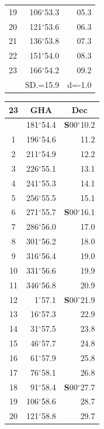 \documentclass[10pt, a4paper]{report}
\begin{document}
\begin{scriptsize}
\begin{tabular*}{0.2\textwidth}[t]{@{\extracolsep{\fill}}|c|rr|}
19 & 106$^\circ$53.3 & 05.3\\
20 & 121$^\circ$53.6 & 06.3\\
21 & 136$^\circ$53.8 & \raisebox{0.24ex}{\boldmath$\cdot$~\boldmath$\cdot$~~}07.3\\
22 & 151$^\circ$54.0 & 08.3\\
23 & 166$^\circ$54.2 & 09.2\\
\hline
\rule{0pt}{2.4ex} & \multicolumn{1}{c}{SD.=15.9} & \multicolumn{1}{c|}{d=-1.0}\\
\hline
\end{tabular*}\noindent
\begin{tabular*}{0.2\textwidth}[t]{@{\extracolsep{\fill}}|c|rr|}
\hline
\multicolumn{1}{|c|}{\rule{0pt}{2.6ex}\textbf{23}} & \multicolumn{1}{c}{\textbf{GHA}} & \multicolumn{1}{c|}{\textbf{Dec}}\\
\hline\rule{0pt}{2.6ex}\noindent
0 & 181$^\circ$54.4 & \textbf{S}00$^\circ$10.2\\
1 & 196$^\circ$54.6 & 11.2\\
2 & 211$^\circ$54.9 & 12.2\\
3 & 226$^\circ$55.1 & \raisebox{0.24ex}{\boldmath$\cdot$~\boldmath$\cdot$~~}13.1\\
4 & 241$^\circ$55.3 & 14.1\\
5 & 256$^\circ$55.5 & 15.1\\[2Pt]
6 & 271$^\circ$55.7 & \textbf{S}00$^\circ$16.1\\
7 & 286$^\circ$56.0 & 17.0\\
8 & 301$^\circ$56.2 & 18.0\\
9 & 316$^\circ$56.4 & \raisebox{0.24ex}{\boldmath$\cdot$~\boldmath$\cdot$~~}19.0\\
10 & 331$^\circ$56.6 & 19.9\\
11 & 346$^\circ$56.8 & 20.9\\[2Pt]
12 & 1$^\circ$57.1 & \textbf{S}00$^\circ$21.9\\
13 & 16$^\circ$57.3 & 22.9\\
14 & 31$^\circ$57.5 & 23.8\\
15 & 46$^\circ$57.7 & \raisebox{0.24ex}{\boldmath$\cdot$~\boldmath$\cdot$~~}24.8\\
16 & 61$^\circ$57.9 & 25.8\\
17 & 76$^\circ$58.1 & 26.8\\[2Pt]
18 & 91$^\circ$58.4 & \textbf{S}00$^\circ$27.7\\
19 & 106$^\circ$58.6 & 28.7\\
20 & 121$^\circ$58.8 & 29.7\\

\end{tabular*}
\end{scriptsize}
\end{document}
